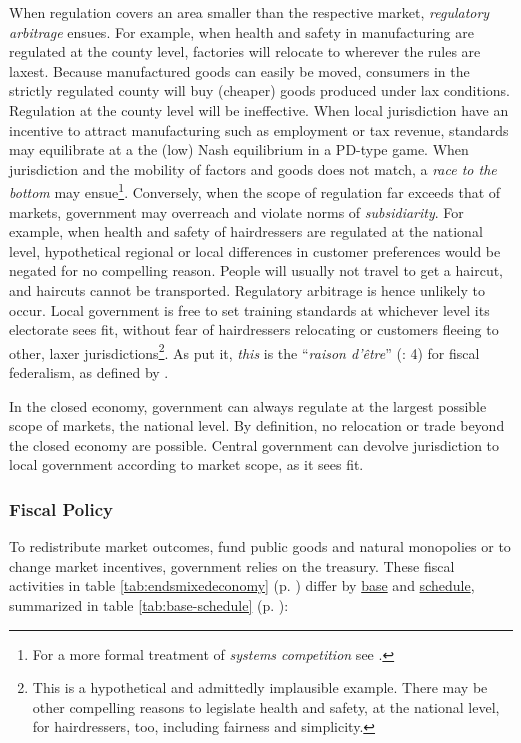 \begin{description}
	When regulation covers an area smaller than the respective market, \emph{regulatory arbitrage} ensues. For example, when health and safety in manufacturing are regulated at the county level, factories will relocate to wherever the rules are laxest. Because manufactured goods can easily be moved, consumers in the strictly regulated county will buy (cheaper) goods produced under lax conditions. Regulation at the county level will be ineffective. When local jurisdiction have an incentive to attract manufacturing such as employment or tax revenue, standards may equilibrate at a the (low) Nash equilibrium in a \gls{PD}-type game. When jurisdiction and the mobility of factors and goods does not match, a \emph{race to the bottom} may ensue\footnote{
		For a more formal treatment of \emph{systems competition} see \cite{Sinn2004}.}. 
	Conversely, when the scope of regulation far exceeds that of markets, government may overreach and violate norms of \emph{subsidiarity}. For example, when health and safety of hairdressers are regulated at the national level, hypothetical regional or local differences in customer preferences would be negated for no compelling reason. People will usually not travel to get a haircut, and haircuts cannot be transported. Regulatory arbitrage is hence unlikely to occur. Local government is free to set training standards at whichever level its electorate sees fit, without fear of hairdressers relocating or customers fleeing to other, laxer jurisdictions\footnote{
		This is a hypothetical and admittedly implausible example. There may be other compelling reasons to legislate health and safety, at the national level, for hairdressers, too, including fairness and simplicity.}.
	As \citeauthor{Bordo2011} put it, \emph{this} is the ``\emph{raison d'\^{e}tre}'' (\citeyear{Bordo2011}: 4) for fiscal federalism, as defined by \cite{Oates1972}.

	In the closed economy, government can always regulate at the largest possible scope of markets, the national level. By definition, no relocation or trade beyond the closed economy are possible. Central government can devolve jurisdiction to local government according to market scope, as it sees fit.

\end{description}

\subsubsection[Fiscal Policy]{Fiscal Policy} \label{sec:fiscal}
To redistribute market outcomes, fund public goods and natural monopolies or to change market incentives, government relies on the treasury. These fiscal activities in table \ref{tab:endsmixedeconomy} (p. \pageref{tab:endsmixedeconomy}) differ by \hyperref[it:base]{base} and \hyperref[it:schedule]{schedule}, summarized in table \ref{tab:base-schedule} (p. \pageref{tab:base-schedule}):


